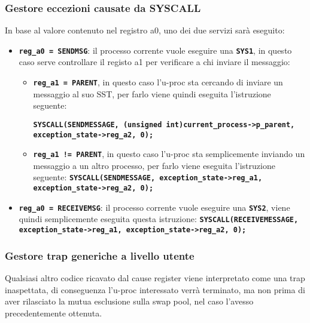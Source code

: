 \documentclass{article}
\begin{document}
\subsubsection{Gestore eccezioni causate da SYSCALL}
In base al valore contenuto nel registro a0, uno dei due servizi sarà eseguito:
\begin{itemize}
  \item \texttt{\textbf{reg\_a0 = SENDMSG}}: il processo corrente vuole eseguire una \texttt{\textbf{SYS1}},
    in questo caso serve controllare il registo a1 per verificare a chi inviare il messaggio:
    \begin{itemize}
      \item \texttt{\textbf{reg\_a1 = PARENT}}, in questo caso l'u-proc sta cercando di inviare 
        un messaggio al suo SST, per farlo viene quindi eseguita l'istruzione seguente: 

        \texttt{\textbf{SYSCALL(SENDMESSAGE, (unsigned int)current\_process->p\_parent, \newline 
        exception\_state->reg\_a2, 0);}}
      \item \texttt{\textbf{reg\_a1 != PARENT}}, in questo caso l'u-proc sta semplicemente inviando un 
        messaggio a un altro processo, per farlo viene eseguita l'istruzione seguente: \newline
        \texttt{\textbf{SYSCALL(SENDMESSAGE, exception\_state->reg\_a1, \newline 
        exception\_state->reg\_a2, 0);}}
    \end{itemize}
  \item \texttt{\textbf{reg\_a0 = RECEIVEMSG}}: il processo corrente vuole eseguire una \texttt{\textbf{SYS2}}, viene quindi semplicemente eseguita questa istruzione: \newline 
    \texttt{\textbf{SYSCALL(RECEIVEMESSAGE, exception\_state->reg\_a1, exception\_state->reg\_a2, 0);}}

\end{itemize}
\subsubsection{Gestore trap generiche a livello utente}
Qualsiasi altro codice ricavato dal cause register viene interpretato come una trap inaspettata, di 
conseguenza l'u-proc interessato verrà terminato, ma non prima di aver rilasciato la mutua esclusione 
sulla swap pool, nel caso l'avesso precedentemente ottenuta.


\newpage
\end{document}
